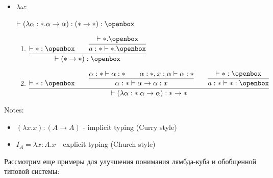 \begin{itemize}
    \item $\lambda \omega$:
\begin{center}
    $\vdash (\lambda \alpha : * . \alpha \rightarrow \alpha) : (* \rightarrow *) : \openbox$

\vspace{5mm}

\begin{enumerate}[]
    \item \begin{center}
        $\vcenter{\infer{\vdash (* \rightarrow *) : \openbox}{\vdash * : \openbox \qquad \infer{a:* \vdash *.\openbox}{\vdash *.\openbox} }}$
    \end{center}
    \item \begin{center} $\vcenter{\infer{\vdash (\lambda \alpha : * . \alpha \rightarrow \alpha) : * \rightarrow *}{\vdash * : \openbox \qquad \infer{\alpha : * \vdash \alpha \rightarrow \alpha : x}{\alpha : * \vdash \alpha : * \qquad \alpha : *, x : \alpha \vdash \alpha : *} \qquad \infer{a:* \vdash *: \openbox}{\vdash * :\openbox} } }$
    \end{center}
\end{enumerate}
\end{center}


\end{itemize}

Notes:
\begin{itemize}
    \item $(\lambda x.x) : (A \rightarrow A)$ - implicit typing (Curry style)
    \item $I_A = \lambda x : A.x$ - explicit typing (Church style)
\end{itemize}

Рассмотрим еще примеры для улучшения понимания лямбда-куба и обобщенной типовой системы:

